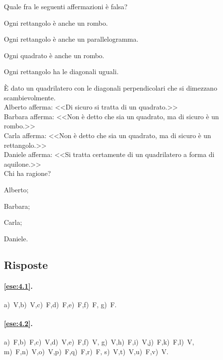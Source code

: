 \begin{esercizio}
\label{ese:4.66}
Quale fra le seguenti affermazioni è falsa?
\begin{enumeratea}
\item Ogni rettangolo è anche un rombo.
\item Ogni rettangolo è anche un parallelogramma.
\item Ogni quadrato è anche un rombo.
\item Ogni rettangolo ha le diagonali uguali.
\end{enumeratea}
\end{esercizio}

\begin{esercizio}
\label{ese:4.67}
\`E dato un quadrilatero con le diagonali perpendicolari che si 
dimezzano scambievolmente.\\
Alberto afferma: <<Di sicuro si tratta di un quadrato.>>\\
Barbara afferma: <<Non è detto che sia un quadrato, ma di sicuro è un 
rombo.>>\\
Carla afferma: <<Non è detto che sia un quadrato, ma di sicuro è un 
rettangolo.>>\\
Daniele afferma: <<Si tratta certamente di un quadrilatero a forma di 
aquilone.>>\\
Chi ha ragione?
\begin{multicols}{4}
\begin{enumeratea}
\item Alberto;
\item Barbara;
\item Carla;
\item Daniele.
\end{enumeratea}
\end{multicols}
\end{esercizio}


\subsection{Risposte}

\begingroup
\hypersetup{linkcolor=black}

\paragraph{\ref{ese:4.1}.}
a)~V,\quad b)~V,\quad c)~F,\quad d)~F,\quad e)~F,\quad f)~F,\quad 
g)~F.

\paragraph{\ref{ese:4.2}.}
a)~F,\quad b)~F,\quad c)~V,\quad d)~V,\quad e)~F,\quad f)~V,\quad 
g)~V,\quad h)~F,\quad i)~V,\quad j)~F,\quad k)~F,\quad l)~V,\quad 
m)~F,\quad n)~V,\quad o)~V,\quad p)~F,\quad q)~F,\quad r)~F,\quad 
s)~V,\quad t)~V,\quad u)~F,\quad v)~V.

